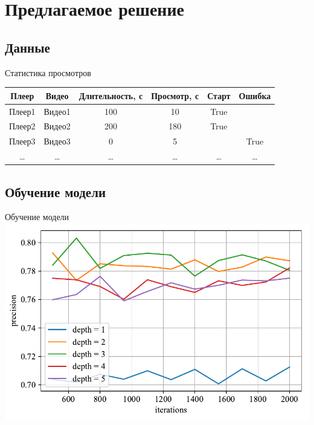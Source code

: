 \documentclass{beamer}
\begin{document}
\section{Предлагаемое решение}

\subsection{Данные}

\begin{frame}{Статистика просмотров}
    \begin{table}
        \centering
        \begin{tabular}{|c|c|c|c|c|c|}
            \hline
            Плеер & Видео & Длительность, с & Просмотр, с & Старт & Ошибка \\
            \hline
            Плеер1 & Видео1 & 100 & 10 & True & \\
            \hline
            Плеер2 & Видео2 & 200 & 180 & True & \\
            \hline
            Плеер3 & Видео3 & 0 & 5 & & True \\
            \hline
            \ldots & \ldots & \ldots & \ldots & \ldots & \ldots \\
            \hline
        \end{tabular}
    \end{table}
\end{frame}

\subsection{Обучение модели}

\begin{frame}{Обучение модели}
    \includegraphics[width=\textwidth]{../images/toloka_catboost_precision.pdf}
\end{frame}
\end{document}
